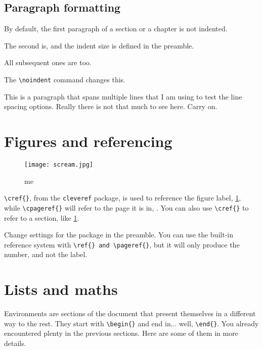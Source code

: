 \documentclass[12pt, letterpaper]{article} %
\begin{document}
\subsection*{Paragraph formatting}

By default, the first paragraph of a section or a chapter is not indented.

The second is, and the indent size is defined in the preamble.

All subsequent ones are too.

\noindent The \verb+\noindent+ command changes this.\par

This is a paragraph that spans multiple lines that I am using to test the 
line spacing options. Really there is not that much to see here. Carry on.

\clearpage
\section{Figures and referencing} \label{sec:fig} %

\begin{figure}[h] %
    \centering %
    \texttt{[image: scream.jpg]} %
    \caption{me} %
    \label{fig:scream} %
\end{figure}

\verb+\cref{}+, from the \texttt{cleveref} package, is used to reference the 
figure label, \cref{fig:scream}, while \verb+\cpageref{}+ will refer to the 
page it is in, . You can also use \verb+\cref{}+ to refer 
to a section, like \cref{sec:fig}. 

Change settings for the package in the preamble. You can use the built-in 
reference system with \verb+\ref{} and \pageref{}+, but it will only produce 
the number, and not the label.

\clearpage
\section{Lists and maths}
Environments are sections of the document that present themselves 
in a different way to the rest. They start with \verb+\begin{}+ and end in... 
well, \verb+\end{}+. You already encountered plenty in the previous sections. 
Here are some of them in more details.
\end{document}
